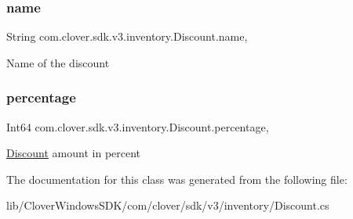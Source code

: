 \subsubsection{\texorpdfstring{name}{name}}
{\footnotesize\ttfamily String com.\+clover.\+sdk.\+v3.\+inventory.\+Discount.\+name\hspace{0.3cm}{\ttfamily [get]}, {\ttfamily [set]}}



Name of the discount 

\mbox{\label{classcom_1_1clover_1_1sdk_1_1v3_1_1inventory_1_1_discount_aa3da776e68604e2725f96b48e4fcfdad}} 
\subsubsection{\texorpdfstring{percentage}{percentage}}
{\footnotesize\ttfamily Int64 com.\+clover.\+sdk.\+v3.\+inventory.\+Discount.\+percentage\hspace{0.3cm}{\ttfamily [get]}, {\ttfamily [set]}}



\hyperlink{classcom_1_1clover_1_1sdk_1_1v3_1_1inventory_1_1_discount}{Discount} amount in percent 



The documentation for this class was generated from the following file\+:\begin{DoxyCompactItemize}
\item 
lib/\+Clover\+Windows\+S\+D\+K/com/clover/sdk/v3/inventory/Discount.\+cs\end{DoxyCompactItemize}

